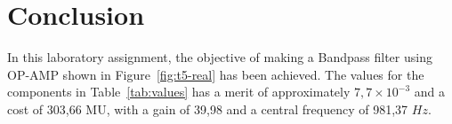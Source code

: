 \section{Conclusion}
\label{sec:conclusion}

In this laboratory assignment, the objective of making a Bandpass filter using OP-AMP shown in
Figure~\ref{fig:t5-real} has been achieved.
The values for the components in Table~\ref{tab:values} has a merit of approximately $7,7 \times 10^{-3}$
and a cost of 303,66 MU, with a gain of 39,98 and a central frequency of 981,37 $Hz$.
